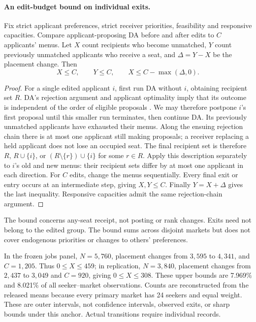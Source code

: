 \paragraph{An edit-budget bound on individual exits.}
\begin{proposition}\label{prop:menu-edit-budget}
Fix strict applicant preferences, strict receiver priorities, feasibility and
responsive capacities. Compare applicant-proposing DA before and after edits
to $C$ applicants' menus. Let $X$ count recipients who become unmatched,
$Y$ count previously unmatched applicants who receive a seat, and
$\Delta=Y-X$ be the placement change. Then
\[
X\le C,\qquad Y\le C,\qquad X\le C-\max(\Delta,0).
\]
\end{proposition}
\begin{proof}
For a single edited applicant $i$, first run DA without $i$, obtaining
recipient set $R$. DA's rejection argument and applicant optimality imply
that its outcome is independent of the order of eligible proposals
\citep[Theorem~2]{gale1962}. We may therefore postpone $i$'s first proposal
until this smaller run terminates, then continue DA. Its previously unmatched
applicants have exhausted their menus. Along the ensuing rejection chain
there is at most one applicant still making proposals; a receiver replacing
a held applicant does not lose an occupied seat. The final recipient set is
therefore $R$, $R\cup\{i\}$, or
$(R\setminus\{r\})\cup\{i\}$ for some $r\in R$.
Apply this description separately to $i$'s old and new menus: their recipient
sets differ by at most one applicant in each direction. For $C$ edits,
change the menus sequentially. Every final exit or entry occurs at an
intermediate step, giving $X,Y\le C$. Finally $Y=X+\Delta$ gives the last
inequality. Responsive capacities admit the same rejection-chain argument.
\end{proof}
The bound concerns any-seat receipt, not posting or rank changes. Exits need
not belong to the edited group. The bound sums across disjoint markets but
does not cover endogenous priorities or changes to others' preferences.

In the frozen jobs panel, $N=5{,}760$, placement changes from $3{,}595$ to
$4{,}341$, and $C=1{,}205$. Thus $0\le X\le 459$; in replication,
$N=3{,}840$, placement changes from $2{,}437$ to $3{,}049$ and $C=920$,
giving $0\le X\le308$. These upper bounds are 7.969\% and 8.021\% of
all seeker--market observations. Counts are reconstructed from the released
means because every primary market has 24 seekers and equal weight.
These are outer intervals, not confidence intervals, observed exits, or
sharp bounds under this anchor. Actual transitions require individual records.

